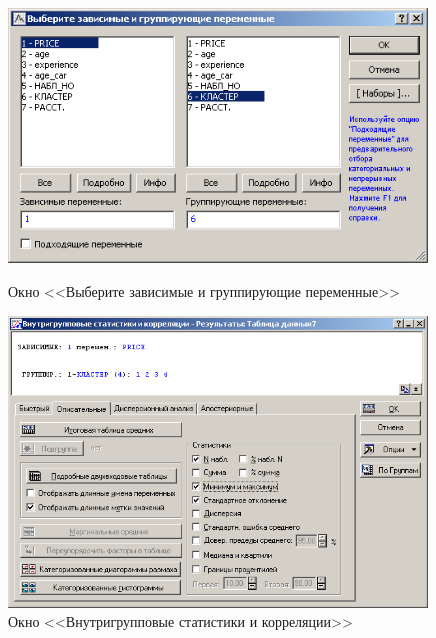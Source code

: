 \begin{figure}[!h]
  \centering
  \begin{minipage}{0.49\textwidth}
    \centering

    \includegraphics[width=0.99\textwidth]
    {inc/cars_my/3.3.PNG}

    \caption{Окно <<Выберите зависимые и группирующие переменные>>}
    \label{fig:3_3}
  \end{minipage}
  \begin{minipage}{0.49\textwidth}
    \centering

    \includegraphics[width=0.99\textwidth]
    {inc/cars_my/3.4.PNG}

    \caption{Окно <<Внутригрупповые статистики и корреляции>>}
    \label{fig:3_4}
  \end{minipage}
\end{figure}

\newpage

